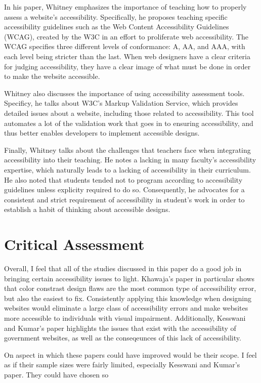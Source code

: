 \documentclass{article}
\begin{document}
In his paper, Whitney emphasizes the importance of teaching how to properly assess a website's accessibility.
Specifically, he proposes teaching specific accessibility guidelines such as the Web Content Accessibility Guidelines (WCAG), created by the W3C in an effort to proliferate web accessibility.
The WCAG specifies three different levels of conformance: A, AA, and AAA, with each level being stricter than the last.
When web designers have a clear criteria for judging accessibility, they have a clear image of what must be done in order to make the website accessible.

Whitney also discusses the importance of using accessibility assessment tools.
Specificy, he talks about W3C's Markup Validation Service, which provides detailed issues about a website, including those related to accessibility.
This tool automates a lot of the validation work that goes in to ensuring accessibility, and thus better enables developers to implement accessible designs.

Finally, Whitney talks about the challenges that teachers face when integrating accessibility into their teaching.
He notes a lacking in many faculty's accessibility expertise, which naturally leads to a lacking of accessibility in their curriculum.
He also noted that students tended not to program according to accessibility guidelines unless explicity required to do so.
Consequently, he advocates for a consistent and strict requirement of accessibility in student's work in order to establish a habit of thinking about accessible designs.


\section{Critical Assessment}
Overall, I feel that all of the studies discussed in this paper do a good job in bringing certain accessibility issues to light.
Khawaja's paper in particular shows that color constrast design flaws are the most common type of accessibility error, but also the easiest to fix.
Consistently applying this knowledge when designing websites would eliminate a large class of accessibility errors and make websites more accessible to individuals with visual impairment.
Additionally, Kesswani and Kumar's paper highlights the issues that exist with the accessibility of government websites, as well as the conseqeunces of this lack of accessibility.

On aspect in which these papers could have improved would be their scope.
I feel as if their sample sizes were fairly limited, especially Kesswani and Kumar's paper.
They could have chosen so
\end{document}
